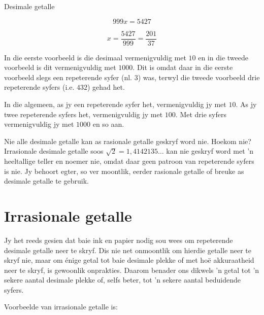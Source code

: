 \begin{Aktiwiteit}{Desimale getalle}
\begin{wex}
{$$ 999x = 5427 $$


$$ x = \dfrac{5427}{999} = \dfrac{201}{37} $$

}
\end{wex}




In die eerste voorbeeld is die desimaal vermenigvuldig met $10$  en in die tweede voorbeeld is dit vermenigvuldig met $1000$. Dit is omdat daar in die eerste voorbeeld slegs een repeterende syfer (nl. $3$) was, terwyl die tweede voorbeeld drie repeterende syfers (i.e. $432$) gehad het.\par 
In die algemeen, as jy een repeterende syfer het, vermenigvuldig jy met $10$.  As jy twee repeterende syfers het,
vermenigvuldig jy met $100$.  Met drie syfers vermenigvuldig jy met $1000$ en so aan.\par

Nie alle desimale getalle kan as rasionale getalle geskryf word nie. Hoekom nie? Irrasionale desimale getalle soos
$\sqrt{2}=1,4142135\ldots$
kan nie geskryf word met ’n heeltallige teller en noemer nie, omdat daar geen patroon van repeterende syfers is nie. Jy behoort egter, so ver moontlik, eerder rasionale getalle of breuke as desimale getalle te gebruik.





\section{Irrasionale getalle}
\setcounter{figure}{1}
\setcounter{subfigure}{1}


Jy het reeds gesien dat baie ink en papier nodig sou wees om repeterende desimale getalle neer te skryf. Dis
nie net onmoontlik om hierdie getalle neer te skryf nie, maar om énige getal tot baie desimale plekke of met hoë
akkuraatheid neer te skryf, is gewoonlik onprakties. Daarom benader ons dikwels ’n getal tot ’n sekere aantal
desimale plekke of, selfs beter, tot ’n sekere aantal beduidende syfers.\par 


Voorbeelde van irrasionale getalle is:\par 


\end{Aktiwiteit}
